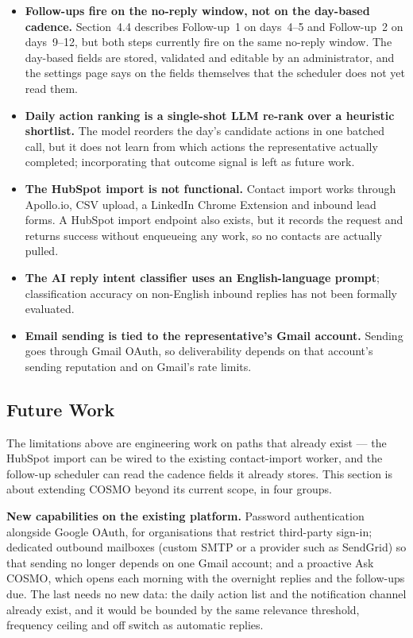 \begin{itemize}
  \item \textbf{Follow-ups fire on the no-reply window, not on the
    day-based cadence.} Section~4.4 describes Follow-up~1 on days~4--5
    and Follow-up~2 on days~9--12, but both steps currently fire on the
    same no-reply window. The day-based fields are stored, validated and
    editable by an administrator, and the settings page says on the fields
    themselves that the scheduler does not yet read them.

  \item \textbf{Daily action ranking is a single-shot LLM
    re-rank over a heuristic shortlist.} The model reorders the
    day's candidate actions in one batched call, but it does not
    learn from which actions the representative actually completed;
    incorporating that outcome signal is left as future work.

  \item \textbf{The HubSpot import is not functional.} Contact import
    works through Apollo.io, CSV upload, a LinkedIn Chrome Extension and
    inbound lead forms. A HubSpot import endpoint also exists, but it records
    the request and returns success without enqueueing any work, so no
    contacts are actually pulled.

  \item \textbf{The AI reply intent classifier uses an
    English-language prompt}; classification accuracy on
    non-English inbound replies has not been formally evaluated.

  \item \textbf{Email sending is tied to the representative's Gmail
    account.} Sending goes through Gmail OAuth, so deliverability depends on
    that account's sending reputation and on Gmail's rate limits.

\end{itemize}

\subsection{Future Work}
\label{sec:future-work}

The limitations above are engineering work on paths that already exist ---
the HubSpot import can be wired to the existing contact-import worker, and the
follow-up scheduler can read the cadence fields it already stores. This section is about extending COSMO beyond its current scope, in
four groups.

\textbf{New capabilities on the existing platform.} Password authentication
alongside Google OAuth, for organisations that restrict third-party sign-in;
dedicated outbound mailboxes (custom SMTP or a provider such as SendGrid) so
that sending no longer depends on one Gmail account; and a proactive Ask COSMO,
which opens each morning with the overnight replies and the follow-ups due. The
last needs no new data: the daily action list and the notification channel
already exist, and it would be bounded by the same relevance threshold,
frequency ceiling and off switch as automatic replies.

